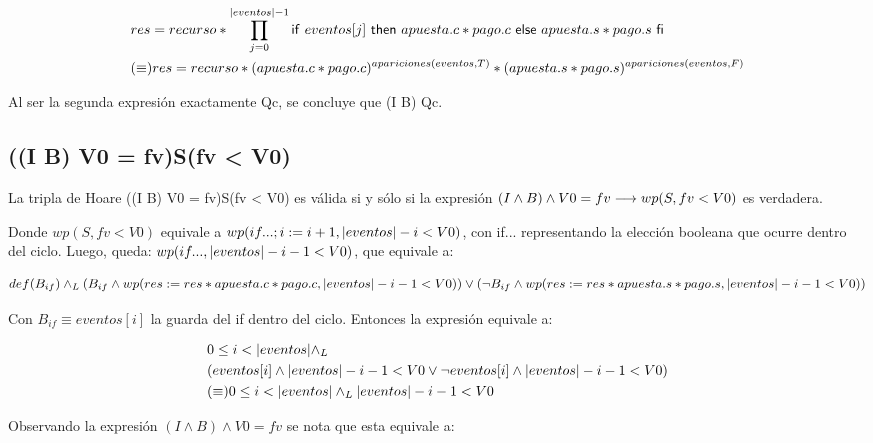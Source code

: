 \documentclass[10pt,a4paper]{article}
\begin{document}
\begin{equation}
\begin{split}
	& res = recurso * \prod\limits_{j=0}^{|eventos|-1} \mathsf{if}\ eventos[j]\ \mathsf{then}\ apuesta.c * pago.c\ \mathsf{else}\ apuesta.s * pago.s\ \mathsf{fi}\\
	& (\equiv) res = recurso * (apuesta.c * pago.c)^{apariciones(eventos, T)} * (apuesta.s * pago.s)^{apariciones(eventos, F)}
\end{split}
\end{equation}

 Al ser la segunda expresión exactamente Qc, se concluye que (I \land \neg B) \implica Qc.

\subsection{((I \land B) \land V0 = fv)S(fv < V0)}

 La tripla de Hoare ((I \land B) \land V0 = fv)S(fv < V0) es válida si y sólo si la expresión
 $(I \land B) \land V0 = fv \longrightarrow wp(S,fv < V0)$ es verdadera.

\vspace{0.3cm}

 Donde $wp(S,fv < V0)$ equivale a $wp(if...; i:= i + 1, |eventos| -i < V0)$,
 con if... representando la elección booleana que ocurre dentro del ciclo.
 Luego, queda: $wp(if..., |eventos| -i - 1 < V0)$, que equivale a:

\begin{equation}
	def(B_{if}) \land _L ( B_{if} \land wp(res:= res*apuesta.c*pago.c , |eventos| -i - 1 < V0)) \lor
					 (\neg B_{if} \land wp(res:= res*apuesta.s*pago.s , |eventos| -i - 1 < V0))
\end{equation}

 Con $B_{if} \equiv eventos[i]$ la guarda del if dentro del ciclo. Entonces la expresión equivale a:

\begin{equation}
\begin{split}
	& 0 \leq i < |eventos| \land _L \\
	& (eventos[i] \land |eventos| -i - 1 < V0 \lor \neg eventos[i] \land |eventos| -i - 1 < V0) \\
	& (\equiv) 0 \leq i < |eventos| \land _L |eventos| -i - 1 < V0
\end{split}
\end{equation}

 Observando la expresión $(I \land B) \land V0 = fv$ se nota que esta equivale a:
 
\end{document}

